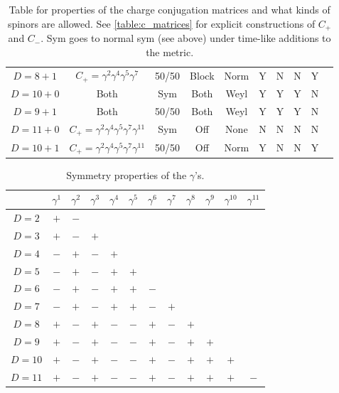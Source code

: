 \documentclass[11pt]{article}
\begin{document}
\begin{table}[H]
\begin{tabular}{|c|c|c|c|c|c|c|c|c|c|}
        $D = 8 + 1$ & $C_+ = \gamma^2 \gamma^4 \gamma^5 \gamma^7$ & 50/50 & Block & Norm & Y & N & N & Y\\
        $D = 10 + 0$ & Both & Sym & Both & Weyl & Y & Y & Y & N\\
        $D = 9 + 1$ & Both & 50/50 & Both & Weyl & Y & Y & Y & N\\
        $D = 11 + 0$ & $C_+ = \gamma^2 \gamma^4 \gamma^5 \gamma^7 \gamma^{11}$ & Sym & Off & None & N & N & N & N\\
        $D = 10 + 1$ & $C_+ = \gamma^2 \gamma^4 \gamma^5 \gamma^7 \gamma^{11}$ & 50/50 & Off & Norm & Y & N & N & Y\\
        \hline
    \end{tabular}
    \caption{Table for properties of the charge conjugation matrices
    and what kinds of spinors are allowed. See \ref{table:c_matrices}
    for explicit constructions of $C_+$ and $C_-$. Sym goes to
    normal sym (see above) under time-like additions to the metric.}
\end{table}

\begin{table}[H]
    \centering
    \begin{tabular}{|c|c|c|c|c|c|c|c|c|c|c|c|}
        \hline
         & $\gamma^1$ & $\gamma^2$ & $\gamma^3$ & $\gamma^4$ & $\gamma^5$ & $\gamma^6$ & $\gamma^7$ & $\gamma^8$ & $\gamma^9$ & $\gamma^{10}$ & $\gamma^{11}$ \\
        \hline
        $D = 2$  &  $+$  &  $-$  &     &     &     &     &     &     &     &     & \\ 
        $D = 3$  &  $+$  &  $-$  &  $+$  &     &     &     &     &     &     &     & \\
        $D = 4$  &  $-$  &  $+$  &  $-$  &  $+$  &     &     &     &     &     &     & \\
        $D = 5$  &  $-$  &  $+$  &  $-$  &  $+$  &  $+$  &     &     &     &     &     & \\
        $D = 6$  &  $-$  &  $+$  &  $-$  &  $+$  &  $+$  &  $-$  &     &     &     &     & \\
        $D = 7$  &  $-$  &  $+$  &  $-$  &  $+$  &  $+$  &  $-$  &  $+$  &     &     &     & \\
        $D = 8$  &  $+$  &  $-$  &  $+$  &  $-$  &  $-$  &  $+$  &  $-$  &  $+$  &     &     & \\
        $D = 9$  &  $+$  &  $-$  &  $+$  &  $-$  &  $-$  &  $+$  &  $-$  &  $+$  &  $+$  &     & \\
        $D = 10$ &  $+$  &  $-$  &  $+$  &  $-$  &  $-$  &  $+$  &  $-$  &  $+$  &  $+$  &  $+$  & \\
        $D = 11$ &  $+$  &  $-$  &  $+$  &  $-$  &  $-$  &  $+$  &  $-$  &  $+$  &  $+$  &  $+$  &  $-$  \\
        \hline
    \end{tabular}
    \caption{Symmetry properties of the $\gamma$'s.}
\end{table}
\end{document}

